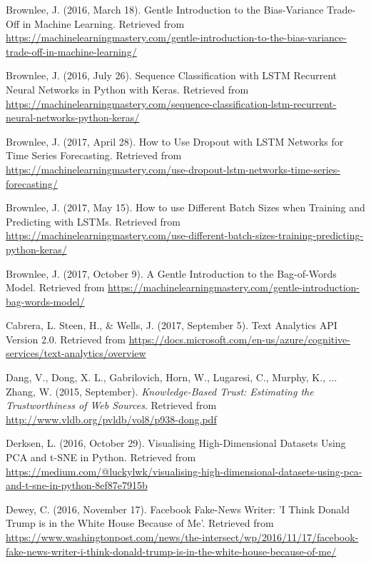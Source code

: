 \begin{thebibliography}{99}
Brownlee, J. (2016, March 18). Gentle Introduction to the Bias-Variance Trade-Off in Machine Learning. Retrieved from \url{https://machinelearningmastery.com/gentle-introduction-to-the-bias-variance-trade-off-in-machine-learning/}

Brownlee, J. (2016, July 26). Sequence Classification with LSTM Recurrent Neural Networks in Python with Keras. Retrieved from \url{https://machinelearningmastery.com/sequence-classification-lstm-recurrent-neural-networks-python-keras/}

Brownlee, J. (2017, April 28). How to Use Dropout with LSTM Networks for Time Series Forecasting. Retrieved from \url{https://machinelearningmastery.com/use-dropout-lstm-networks-time-series-forecasting/}

Brownlee, J. (2017, May 15). How to use Different Batch Sizes when Training and Predicting with LSTMs. Retrieved from \url{https://machinelearningmastery.com/use-different-batch-sizes-training-predicting-python-keras/}

Brownlee, J. (2017, October 9). A Gentle Introduction to the Bag-of-Words Model. Retrieved from \url{https://machinelearningmastery.com/gentle-introduction-bag-words-model/}

Cabrera, L. Steen, H., \& Wells, J. (2017, September 5). Text Analytics API Version 2.0. Retrieved from \url{https://docs.microsoft.com/en-us/azure/cognitive-services/text-analytics/overview}

Dang, V., Dong, X. L., Gabrilovich, Horn, W., Lugaresi, C., Murphy, K., ... Zhang, W.  (2015, September). \textit{Knowledge-Based Trust: Estimating the Trustworthiness of Web Sources}. Retrieved from \url{http://www.vldb.org/pvldb/vol8/p938-dong.pdf}

Derksen, L. (2016, October 29). Visualising High-Dimensional Datasets Using PCA and t-SNE in Python. Retrieved from \url{https://medium.com/@luckylwk/visualising-high-dimensional-datasets-using-pca-and-t-sne-in-python-8ef87e7915b}

Dewey, C. (2016, November 17). Facebook Fake-News Writer: 'I Think Donald Trump is in the White House Because of Me'. Retrieved from \url{https://www.washingtonpost.com/news/the-intersect/wp/2016/11/17/facebook-fake-news-writer-i-think-donald-trump-is-in-the-white-house-because-of-me/}


\end{thebibliography}
